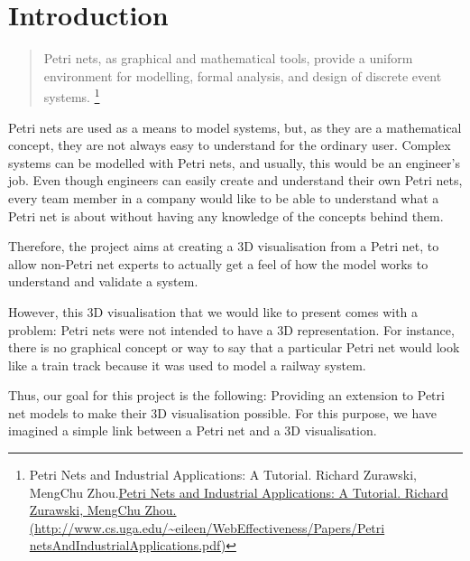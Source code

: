 \section{Introduction}



\begin{quotation}
Petri nets, as graphical and mathematical tools, provide a uniform environment for modelling, formal analysis, and design of discrete event systems. \footnote{Petri Nets and Industrial Applications: A Tutorial. Richard Zurawski, MengChu Zhou.\url{Petri Nets and Industrial Applications: A Tutorial. Richard Zurawski, MengChu Zhou. (http://www.cs.uga.edu/~eileen/WebEffectiveness/Papers/Petri netsAndIndustrialApplications.pdf)}}
\end{quotation}

Petri nets are used as a means to model systems, but, as they are a mathematical concept, they are not always easy to understand for the ordinary user. Complex systems can be modelled with Petri nets, and usually, this would be an engineer's job. Even though engineers can easily create and understand their own Petri nets, every team member in a company would like to be able to understand what a Petri net is about without having any knowledge of the concepts behind them.

Therefore, the project aims at creating a 3D visualisation from a Petri net, to allow non-Petri net experts to actually get a feel of how the model works to understand and validate a system.

However, this 3D visualisation that we would like to present comes with a problem: Petri nets were not intended to have a 3D representation. For instance, there is no graphical concept or way to say that a particular Petri net would look like a train track because it was used to model a railway system. 

Thus, our goal for this project is the following: Providing an extension to Petri net models to make their 3D visualisation possible. For this purpose, we have imagined a simple link between a Petri net and a 3D visualisation.
